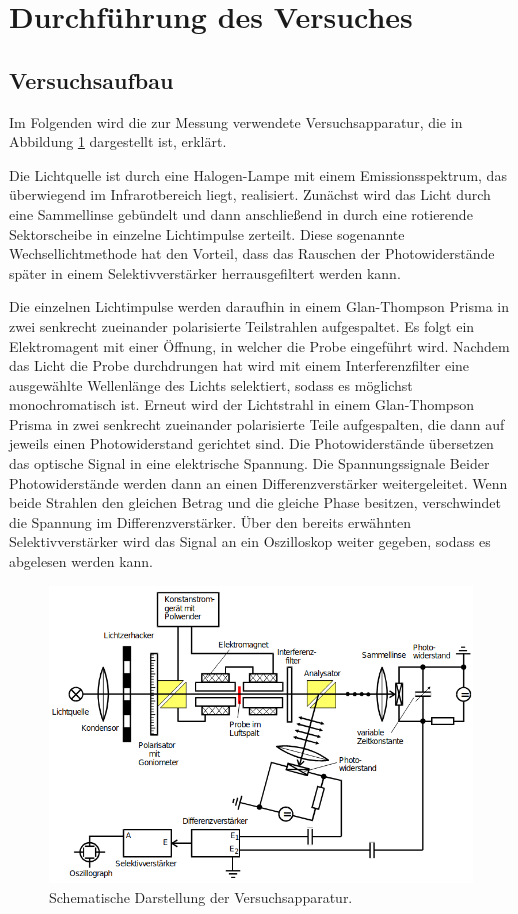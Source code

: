 \section{Durchführung des Versuches}
\label{sec:Durchführung}
\subsection{Versuchsaufbau}
Im Folgenden wird die zur Messung verwendete Versuchsapparatur, die in Abbildung \ref{fig:apparatur} dargestellt ist, erklärt.

Die Lichtquelle ist durch eine Halogen-Lampe mit einem Emissionsspektrum, das überwiegend im Infrarotbereich liegt, realisiert. 
Zunächst wird das Licht durch eine Sammellinse gebündelt und dann anschließend in durch eine rotierende Sektorscheibe in 
einzelne Lichtimpulse zerteilt. 
Diese sogenannte Wechsellichtmethode hat den Vorteil, dass das Rauschen der Photowiderstände später in einem Selektivverstärker
herrausgefiltert werden kann.

Die einzelnen Lichtimpulse werden daraufhin in einem Glan-Thompson Prisma in zwei senkrecht 
zueinander polarisierte Teilstrahlen aufgespaltet. Es folgt ein Elektromagent mit einer Öffnung, in welcher die Probe eingeführt
wird. Nachdem das Licht die Probe durchdrungen hat wird mit einem Interferenzfilter eine ausgewählte Wellenlänge des Lichts 
selektiert, sodass es möglichst monochromatisch ist. Erneut wird der Lichtstrahl in einem Glan-Thompson Prisma in zwei 
senkrecht zueinander polarisierte Teile aufgespalten, die dann auf jeweils einen Photowiderstand gerichtet sind. Die Photowiderstände
übersetzen das optische Signal in eine elektrische Spannung. Die Spannungssignale Beider Photowiderstände werden dann an einen
Differenzverstärker weitergeleitet. Wenn beide Strahlen den gleichen Betrag und die gleiche Phase besitzen, verschwindet die Spannung
im Differenzverstärker. Über den bereits erwähnten Selektivverstärker wird das Signal an ein Oszilloskop weiter gegeben, sodass
es abgelesen werden kann.   

\begin{figure}[H]
    \centering
    \includegraphics[scale=0.5]{pictures/Versuchsaufbau.png}
    \caption{Schematische Darstellung der Versuchsapparatur. \cite{Versuchsbeschreibung}}
    \label{fig:apparatur}
\end{figure}

